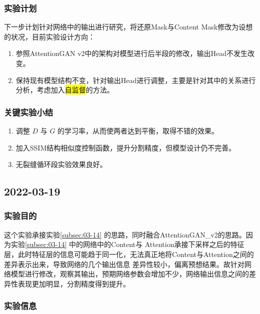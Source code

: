 \subsubsection{实验计划}

下一步计划针对网络中的输出进行研究，将还原Mask与Content Mask修改为设想的状况，目前实验设计方向：
\begin{enumerate}[1.]
	\item 参照AttentionGAN v2中的架构对模型进行后半段的修改，输出Head不发生改变。
	\item 保持现有模型结构不变，针对输出Head进行调整，主要是针对其中的关系进行分析，考虑加入\colorbox{yellow}{自监督}的方法。
\end{enumerate}

\subsubsection{关键实验小结}
\begin{enumerate}[1.]
	\item 调整 $D$ 与 $G$ 的学习率，从而使两者达到平衡，取得不错的效果。
	\item 加入SSIM结构相似度控制函数，提升分割精度，但模型设计仍不完善。
	\item 无裂缝循环段实验效果良好。
\end{enumerate}
\newpage


\subsection{2022-03-19}\label{subsec:03-19}

\subsubsection{实验目的}

这个实验承接实验\ref{subsec:03-14} 的思路，同时融合AttentionGAN\_v2的思路。因为实验\ref{subsec:03-14} 中的网络中的Content与
Attention承接下采样之后的特征层，此时特征层的信息可能趋于同一化，无法真正地将Content与Attention之间的差异表示出来，导致网络的几个输出信息
差异性较小，偏离预想结果。故针对网络模型进行修改，观察其输出，预期网络参数会增加不少，网络输出信息之间的差异性表现更加明显，分割精度得到提升。

\subsubsection{实验信息}


